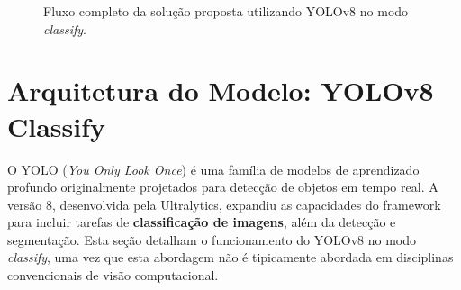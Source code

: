 \documentclass[12pt, a4paper]{article}
\begin{document}
\begin{figure}[H]
\centering
{}
\caption{Fluxo completo da solução proposta utilizando YOLOv8 no modo \textit{classify}.}
\label{fig:fluxo}
\end{figure}

\section{Arquitetura do Modelo: YOLOv8 Classify}

O YOLO (\textit{You Only Look Once}) é uma família de modelos de aprendizado profundo originalmente projetados para detecção de objetos em tempo real. A versão 8, desenvolvida pela Ultralytics, expandiu as capacidades do framework para incluir tarefas de \textbf{classificação de imagens}, além da detecção e segmentação. Esta seção detalham o funcionamento do YOLOv8 no modo \textit{classify}, uma vez que esta abordagem não é tipicamente abordada em disciplinas convencionais de visão computacional.
\end{document}
